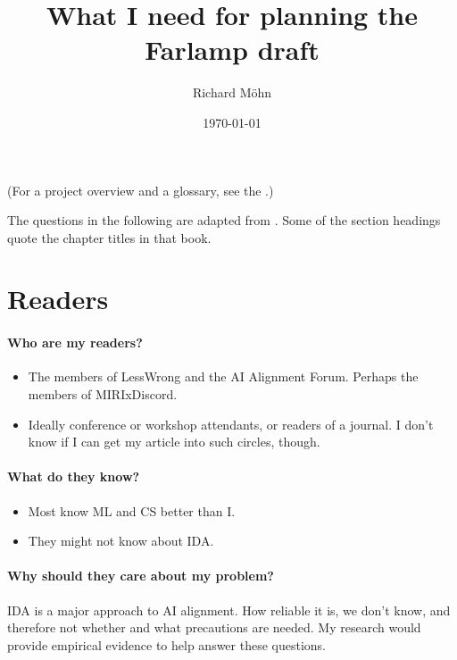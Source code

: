 \documentclass{farlamp}
\title{What I need for planning the Farlamp draft}
\author{Richard Möhn}
\date{\today}
\begin{document}
\maketitle
\RaggedRight

(For a project overview and a glossary, see the \FarlampRepo.)

The questions in the following are adapted from \textcite[p. 175]{CoR}. Some of
the section headings quote the chapter titles in that book.

\section{Readers}

\paragraph{Who are my readers?}

\begin{itemize}
\item The members of LessWrong and the AI Alignment Forum. Perhaps the members
    of MIRIxDiscord.
\item Ideally conference or workshop attendants, or readers of a journal. I
    don't know if I can get my article into such circles, though.
\end{itemize}

\paragraph{What do they know?}

\begin{itemize}
\item Most know ML and CS better than I.
\item They might not know about IDA.
\end{itemize}

\paragraph{Why should they care about my problem?}

IDA is a major approach to AI alignment. How reliable it is, we don't know, and
therefore not whether and what precautions are needed. My research would provide
empirical evidence to help answer these questions.


\end{document}
